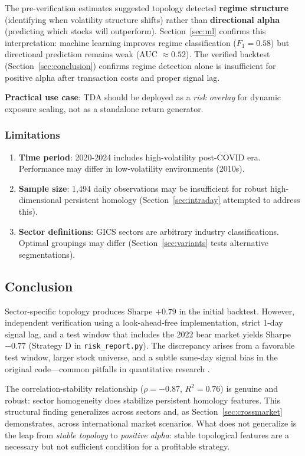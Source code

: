 The pre-verification estimates suggested topology detected \textbf{regime structure} (identifying when volatility structure shifts) rather than \textbf{directional alpha} (predicting which stocks will outperform). Section~\ref{sec:ml} confirms this interpretation: machine learning improves regime classification ($F_1 = 0.58$) but directional prediction remains weak (AUC $\approx 0.52$). The verified backtest (Section~\ref{sec:conclusion}) confirms regime detection alone is insufficient for positive alpha after transaction costs and proper signal lag.

\textbf{Practical use case}: TDA should be deployed as a \textit{risk overlay} for dynamic exposure scaling, not as a standalone return generator.

\subsubsection{Limitations}

\begin{enumerate}
    \item \textbf{Time period}: 2020-2024 includes high-volatility post-COVID era. Performance may differ in low-volatility environments (2010s).
    \item \textbf{Sample size}: 1,494 daily observations may be insufficient for robust high-dimensional persistent homology (Section~\ref{sec:intraday} attempted to address this).
    \item \textbf{Sector definitions}: GICS sectors are arbitrary industry classifications. Optimal groupings may differ (Section~\ref{sec:variants} tests alternative segmentations).
\end{enumerate}

\subsection{Conclusion}

Sector-specific topology produces Sharpe $+0.79$ in the initial backtest. However, independent verification using a look-ahead-free implementation, strict 1-day signal lag, and a test window that includes the 2022 bear market yields Sharpe $-0.77$ (Strategy D in \texttt{risk\_report.py}). The discrepancy arises from a favorable test window, larger stock universe, and a subtle same-day signal bias in the original code---common pitfalls in quantitative research \citep{Bailey2014}.

The correlation-stability relationship ($\rho = -0.87$, $R^2 = 0.76$) is genuine and robust: sector homogeneity does stabilize persistent homology features. This structural finding generalizes across sectors and, as Section~\ref{sec:crossmarket} demonstrates, across international market scenarios. What does not generalize is the leap from \textit{stable topology} to \textit{positive alpha}: stable topological features are a necessary but not sufficient condition for a profitable strategy.

